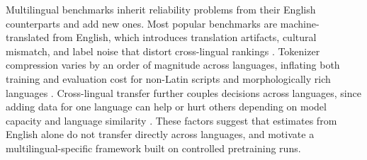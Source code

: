 Multilingual benchmarks inherit reliability problems from their English counterparts and add new ones. Most popular benchmarks are machine-translated from English, which introduces translation artifacts, cultural mismatch, and label noise that distort cross-lingual rankings \citep{plaza_spanish_2024, singh_global_2024, romanou_include_2024}. Tokenizer compression varies by an order of magnitude across languages, inflating both training and evaluation cost for non-Latin scripts and morphologically rich languages \citep{ahia_all_2023, petrov_language_2023}. Cross-lingual transfer further couples decisions across languages, since adding data for one language can help or hurt others depending on model capacity and language similarity \citep{chang-etal-2024-multilinguality, longpre_atlas_2026}. These factors suggest that estimates from English alone do not transfer directly across languages, and motivate a multilingual-specific framework built on controlled pretraining runs.
